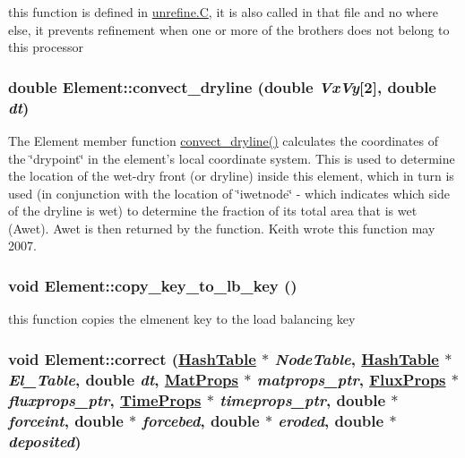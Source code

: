 this function is defined in \hyperlink{constant_8h_a21}{unrefine.C}, it is also called in that file and no where else, it prevents refinement when one or more of the brothers does not belong to this processor 

\hypertarget{classElement_a132}{
\subsubsection[convect\_\-dryline]{\setlength{\rightskip}{0pt plus 5cm}double Element::convect\_\-dryline (double {\em Vx\-Vy}\mbox{[}2\mbox{]}, double {\em dt})}}
\label{classElement_a132}


The Element member function \hyperlink{classElement_a132}{convect\_\-dryline()} calculates the coordinates of the \char`\"{}drypoint\char`\"{} in the element's local coordinate system. This is used to determine the location of the wet-dry front (or dryline) inside this element, which in turn is used (in conjunction with the location of \char`\"{}iwetnode\char`\"{} - which indicates which side of the dryline is wet) to determine the fraction of its total area that is wet (Awet). Awet is then returned by the function. Keith wrote this function may 2007. 

\hypertarget{classElement_a58}{
\subsubsection[copy\_\-key\_\-to\_\-lb\_\-key]{\setlength{\rightskip}{0pt plus 5cm}void Element::copy\_\-key\_\-to\_\-lb\_\-key ()}}
\label{classElement_a58}


this function copies the elmenent key to the load balancing key 

\hypertarget{classElement_a80}{
\subsubsection[correct]{\setlength{\rightskip}{0pt plus 5cm}void Element::correct (\hyperlink{classHashTable}{Hash\-Table} $\ast$ {\em Node\-Table}, \hyperlink{classHashTable}{Hash\-Table} $\ast$ {\em El\_\-Table}, double {\em dt}, \hyperlink{structMatProps}{Mat\-Props} $\ast$ {\em matprops\_\-ptr}, \hyperlink{structFluxProps}{Flux\-Props} $\ast$ {\em fluxprops\_\-ptr}, \hyperlink{structTimeProps}{Time\-Props} $\ast$ {\em timeprops\_\-ptr}, double $\ast$ {\em forceint}, double $\ast$ {\em forcebed}, double $\ast$ {\em eroded}, double $\ast$ {\em deposited})}}
\label{classElement_a80}


